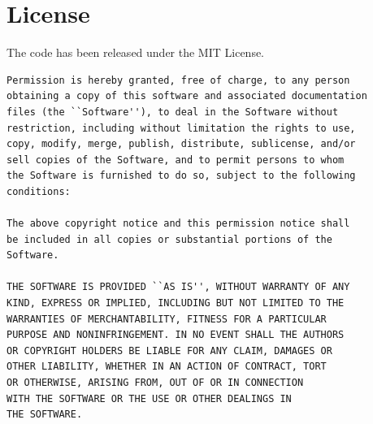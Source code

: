 \documentclass[12pt,titlepage]{article}
\begin{document}

\section{License}
The code has been released under the MIT License. 
\begin{verbatim}
Permission is hereby granted, free of charge, to any person 
obtaining a copy of this software and associated documentation 
files (the ``Software''), to deal in the Software without 
restriction, including without limitation the rights to use, 
copy, modify, merge, publish, distribute, sublicense, and/or
sell copies of the Software, and to permit persons to whom 
the Software is furnished to do so, subject to the following 
conditions:

The above copyright notice and this permission notice shall 
be included in all copies or substantial portions of the 
Software.

THE SOFTWARE IS PROVIDED ``AS IS'', WITHOUT WARRANTY OF ANY 
KIND, EXPRESS OR IMPLIED, INCLUDING BUT NOT LIMITED TO THE 
WARRANTIES OF MERCHANTABILITY, FITNESS FOR A PARTICULAR 
PURPOSE AND NONINFRINGEMENT. IN NO EVENT SHALL THE AUTHORS 
OR COPYRIGHT HOLDERS BE LIABLE FOR ANY CLAIM, DAMAGES OR 
OTHER LIABILITY, WHETHER IN AN ACTION OF CONTRACT, TORT 
OR OTHERWISE, ARISING FROM, OUT OF OR IN CONNECTION 
WITH THE SOFTWARE OR THE USE OR OTHER DEALINGS IN 
THE SOFTWARE.
\end{verbatim}
\end{document}
